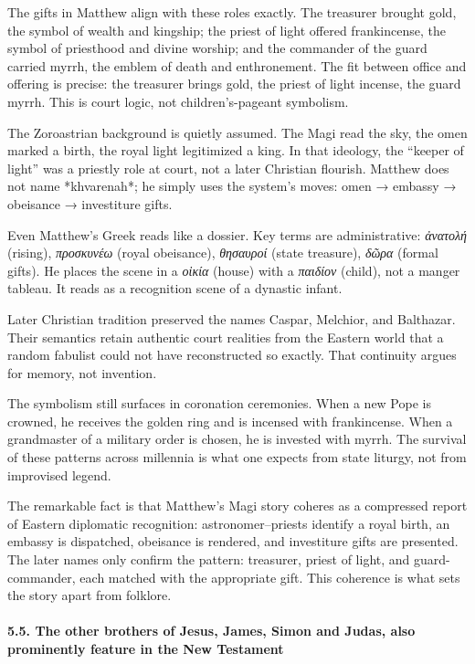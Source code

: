 The gifts in Matthew align with these roles exactly.
The treasurer brought gold, the symbol of wealth and kingship; the priest of light offered frankincense, the symbol of priesthood and divine worship; and the commander of the guard carried myrrh, the emblem of death and enthronement.
The fit between office and offering is precise: the treasurer brings gold, the priest of light incense, the guard myrrh.
This is court logic, not children’s-pageant symbolism.

The Zoroastrian background is quietly assumed.
The Magi read the sky, the omen marked a birth, the royal light legitimized a king.
In that ideology, the “keeper of light” was a priestly role at court, not a later Christian flourish.
Matthew does not name *khvarenah*; he simply uses the system’s moves: omen → embassy → obeisance → investiture gifts.

Even Matthew’s Greek reads like a dossier.
Key terms are administrative: \textit{ἀνατολή} (rising), \textit{προσκυνέω} (royal obeisance), \textit{θησαυροί} (state treasure), \textit{δῶρα} (formal gifts).
He places the scene in a \textit{οἰκία} (house) with a \textit{παιδίον} (child), not a manger tableau.
It reads as a recognition scene of a dynastic infant.

Later Christian tradition preserved the names Caspar, Melchior, and Balthazar.
Their semantics retain authentic court realities from the Eastern world that a random fabulist could not have reconstructed so exactly.
That continuity argues for memory, not invention.

The symbolism still surfaces in coronation ceremonies.
When a new Pope is crowned, he receives the golden ring and is incensed with frankincense.
When a grandmaster of a military order is chosen, he is invested with myrrh.
The survival of these patterns across millennia is what one expects from state liturgy, not from improvised legend.

The remarkable fact is that Matthew’s Magi story coheres as a compressed report of Eastern diplomatic recognition: astronomer–priests identify a royal birth, an embassy is dispatched, obeisance is rendered, and investiture gifts are presented.
The later names only confirm the pattern: treasurer, priest of light, and guard-commander, each matched with the appropriate gift.
This coherence is what sets the story apart from folklore.

\paragraph{5.5.
The other brothers of Jesus, James, Simon and Judas, also prominently feature in the New Testament}\label{par:the-other-brothers-of-jesus-james-simon-and-judas-also-prominently-feature-in-the-new-testament}

